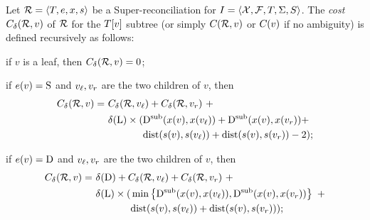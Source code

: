 \begin{definition}\label{def:superdtl:cost}
    Let \(\mathcal{R} = \left\langle T, e, x, s\right\rangle\) be a
    Super-reconciliation for \(I = \left\langle\mathcal{X}, \mathcal{F}, T, \Sigma, S\right\rangle\). The
    \emph{cost} \(C_{\delta\kern.1pt}(\mathcal{R}, v)\) of \(\mathcal{R}\) for the
    \(T[v]\) subtree (or simply \(C_{}(\mathcal{R}, v)\) or \(C_{}(v)\) if no ambiguity) is defined recursively as follows:

\begin{compactitemize}
    \item if \(v\) is a leaf, then \(C_{\delta\kern.1pt}(\mathcal{R}, v) = 0\);
    \item if \(e(v) = \mathrm{S}\) and \(v_\mathit{\ell}, v_r\) are the two children of \(v\), then
        \begin{align*}
            C_{\delta\kern.1pt}(\mathcal{R}, v) =\ &
            C_{\delta\kern.1pt}(\mathcal{R}, v_\mathit{\ell}) + C_{\delta\kern.1pt}(\mathcal{R}, v_r)\ +\\
            & \begin{aligned}[t]
            \delta\kern.1pt(\mathrm{L}) \times (
                &\mathrm{D}^\mathrm{sub}(x(v), x(v_\mathit{\ell}))
                + \mathrm{D}^\mathrm{sub}(x(v), x(v_r)) +\\
                &\mathrm{dist}(s(v), s(v_\mathit{\ell}))
                + \mathrm{dist}(s(v), s(v_r))
                - 2
            );
            \end{aligned}
        \end{align*}
    \item if \(e(v) = \mathrm{D}\) and \(v_\mathit{\ell}, v_r\) are the two children of \(v\), then
        \begin{align*}
            C_{\delta\kern.1pt}(\mathcal{R}, v) =\ &
            \delta\kern.1pt(\mathrm{D}) + C_{\delta\kern.1pt}(\mathcal{R}, v_\mathit{\ell}) + C_{\delta\kern.1pt}(\mathcal{R}, v_r)\ +\\
            & \begin{aligned}[t]
            \delta\kern.1pt(\mathrm{L}) \times (
                &\min\left\{
                    \mathrm{D}^\mathrm{sub}(x(v), x(v_\mathit{\ell})),
                    \mathrm{D}^\mathrm{sub}(x(v), x(v_r))
                \right\}\ +\\
                &\mathrm{dist}(s(v), s(v_\mathit{\ell})) +
                \mathrm{dist}(s(v), s(v_r))
            );
            \end{aligned}
        \end{align*}

\end{compactitemize}
\end{definition}
